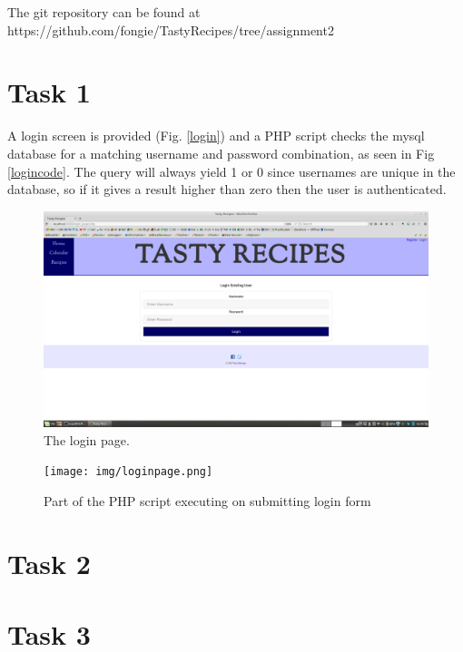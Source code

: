 \documentclass[a4paper]{scrreprt}
\begin{document}
The git repository can be found at https://github.com/fongie/TastyRecipes/tree/assignment2

\section{Task 1}

A login screen is provided (Fig. \ref{login}) and a PHP script checks the mysql database for a matching username and password combination, as seen in Fig \ref{logincode}. The query will always yield 1 or 0 since usernames are unique in the database, so if it gives a result higher than zero then the user is authenticated.

\begin{figure}[h!]
  \begin{center}
    \includegraphics[scale=0.41]{img/login.png}
    \caption{The login page.}
    \label{fig:login}
  \end{center}
\end{figure}

\begin{figure}[h!]
  \begin{center}
    \texttt{[image: img/loginpage.png]}
    \caption{Part of the PHP script executing on submitting login form}
    \label{fig:loginpage}
  \end{center}
\end{figure}

\section{Task 2}

\section{Task 3}
\end{document}
